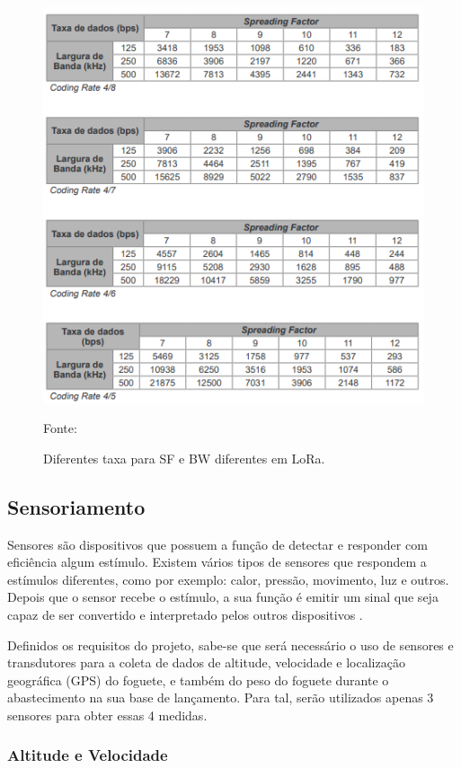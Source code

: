 \begin{figure}[H]
  \centering
  \includegraphics[scale=0.8]{figuras/tabela de taxa lora.png}
  \caption{Diferentes taxa para SF e BW diferentes em LoRa. }
 { \footnotesize Fonte:\cite{aplicacaoloratabela}} 
  \label{fig:taxalora}
\end{figure}


\subsection{Sensoriamento}

Sensores são dispositivos que possuem a função de detectar e responder com eficiência algum estímulo. Existem vários tipos de sensores que respondem a estímulos diferentes, como por exemplo: calor, pressão, movimento, luz e outros. Depois que o sensor recebe o estímulo, a sua função é emitir um sinal que seja capaz de ser convertido e interpretado pelos outros dispositivos \cite{mattede_Sensores_blog2020}.

Definidos os requisitos do projeto, sabe-se que será necessário o uso de sensores e transdutores para a coleta de dados de altitude, velocidade e localização geográfica (GPS) do foguete, e também do peso do foguete durante o abastecimento na sua base de lançamento. Para tal, serão utilizados apenas 3 sensores para obter essas 4 medidas.

\subsubsection{Altitude e Velocidade}

